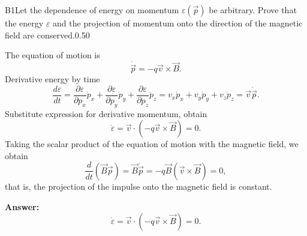 \documentclass[11pt,a4paper]{article}
\begin{document}
\begin{solcard}{B1}{Let the dependence of energy on momentum $\varepsilon(\vec{p})$ be arbitrary. Prove that the energy $\varepsilon$ and the projection of momentum onto the direction of the magnetic field are conserved.}{0.50}

The equation of motion is $$ \dot{\vec{p}} = - q \vec{v} \times \vec{B}. $$Derivative energy by time $$ \frac{d \varepsilon} {dt} = \frac{\partial \varepsilon}{\partial p_x} \dot{p}_x + \frac{\partial \varepsilon}{\partial p_y} \dot{p}_y  +\frac{\partial \varepsilon}{\partial p_z} \dot{p}_z = v_x \dot{p}_x + v_y \dot{p}_y + v_z \dot {p}_z = \vec{v} \dot{\vec{p}}. $$Substitute expression for derivative momentum, obtain $$ \dot{\varepsilon} = \vec{v} \cdot\left(- q \vec{v}  \times \vec{B}\right) = 0. $$Taking the scalar product of the equation of motion with the magnetic field, we obtain $$ \frac{d}{dt} (\vec{B}{\vec{p}}) = \vec{B} \dot{\vec{p}} = - q \vec{B} (\vec{v} \times \vec{B}) = 0, $$that is, the projection of the impulse onto the magnetic field is constant.

\par\smallskip\noindent\textbf{Answer:} $$ \dot{\varepsilon} = \vec{v} \cdot\left(- q \vec{v}  \times \vec{B}\right) = 0. $$
\end{solcard}
\end{document}
